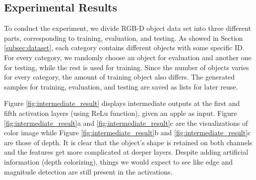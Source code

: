 \subsection{Experimental Results}
\label{subsec:exp_result}

To conduct the experiment, we divide RGB-D object data set into three different parts, corresponding to training, evaluation, and testing. As showed in Section \ref{subsec:dataset}, each category contains different objects with some specific ID. For every category, we randomly choose an object for evaluation and another one for testing, while the rest is used for training. Since the number of objects varies for every category, the amount of training object also differs. The generated samples for training, evaluation, and testing are saved as lists for later reuse.

Figure \ref{fig:intermediate_result} displays intermediate outputs at the first and fifth activation layers (using ReLu function), given an apple as input. Figure \ref{fig:intermediate_result}a and \ref{fig:intermediate_result}c are the visualizations of color image while Figure \ref{fig:intermediate_result}b and \ref{fig:intermediate_result}c are those of depth. It is clear that the object's shape is retained on both channels and the features get more complicated at deeper layers. Despite adding artificial information (depth colorizing), things we would expect to see like edge and magnitude detection are still present in the activations.

